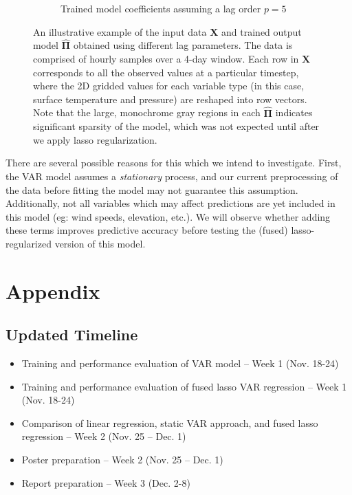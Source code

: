 \documentclass{article} %
\newcommand{\bs}{\boldsymbol}
\newcommand{\VARlag}{p}
\newcommand{\VARdata}{\bs{X}}
\newcommand{\VARmodel}{\bs{\Pi}}
\newcommand{\predicted}{\hat}
\begin{document}
\begin{figure}[t]
\begin{subfigure}[b]{0.2\textwidth}
	\caption{Trained model coefficients assuming a lag order $\VARlag = 5$}
\end{subfigure}
\caption{An illustrative example of the input data $\VARdata$ and trained output model $\predicted{\VARmodel}$ obtained using different lag parameters. The data is comprised of hourly samples over a 4-day window. Each row in $\VARdata$ corresponds to all the observed values at a particular timestep, where the 2D gridded values for each variable type (in this case, surface temperature and pressure) are reshaped into row vectors. Note that the large, monochrome gray regions in each $\predicted{\VARmodel}$ indicates significant sparsity of the model, which was not expected until after we apply lasso regularization. }
\label{fig:var_data_example}
\end{figure}

There are several possible reasons for this which we intend to investigate. First, the VAR model assumes a \emph{stationary} process, and our current preprocessing of the data before fitting the model may not guarantee this assumption. Additionally, not all variables which may affect predictions are yet included in this model (eg: wind speeds, elevation, etc.). We will observe whether adding these terms improves predictive accuracy before testing the (fused) lasso-regularized version of this model.

\section{Appendix}

\subsection{Updated Timeline}
\begin{itemize}
\item Training and performance evaluation of VAR model – Week 1 (Nov. 18-24)
\item Training and performance evaluation of fused lasso VAR regression – Week 1 (Nov. 18-24)
\item Comparison of linear regression, static VAR approach, and fused lasso regression – Week 2 (Nov. 25 – Dec. 1)
\item Poster preparation – Week 2 (Nov. 25 – Dec. 1)
\item Report preparation – Week 3 (Dec. 2-8)
\end{itemize}




\end{document}
